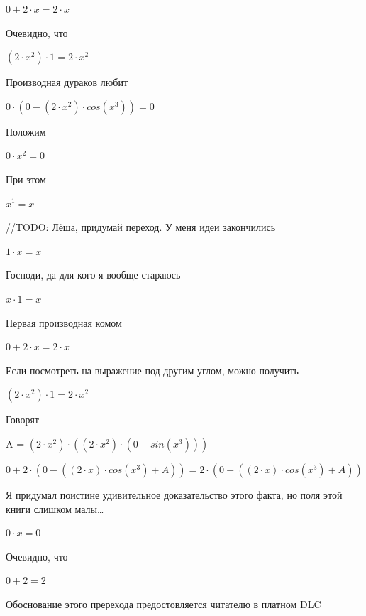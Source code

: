 \documentclass[12pt,a4paper,fleqn]{article}
\begin{document}
\begin{center}
$0+2 \cdot x = 2 \cdot x$\end{center}
Очевидно, что

\begin{center}
$(2 \cdot x^{2}) \cdot 1 = 2 \cdot x^{2}$\end{center}
Производная дураков любит\cite{link2}

\begin{center}
$0 \cdot (0-(2 \cdot x^{2}) \cdot cos(x^{3})) = 0$\end{center}
Положим

\begin{center}
$0 \cdot x^{2} = 0$\end{center}
При этом

\begin{center}
$x^{1} = x$\end{center}
//TODO: Лёша, придумай переход. У меня идеи закончились

\begin{center}
$1 \cdot x = x$\end{center}
Господи, да для кого я вообще стараюсь

\begin{center}
$x \cdot 1 = x$\end{center}
Первая производная комом\cite{link2}

\begin{center}
$0+2 \cdot x = 2 \cdot x$\end{center}
Если посмотреть на выражение под другим углом, можно получить

\begin{center}
$(2 \cdot x^{2}) \cdot 1 = 2 \cdot x^{2}$\end{center}
Говорят

\begin{center}
A = $(2 \cdot x^{2}) \cdot ((2 \cdot x^{2}) \cdot (0-sin(x^{3})))$\end{center}
\begin{center}
$0+2 \cdot (0-((2 \cdot x) \cdot cos(x^{3})+A)) = 2 \cdot (0-((2 \cdot x) \cdot cos(x^{3})+A))$\end{center}
Я придумал поистине удивительное доказательство этого факта, но поля этой книги слишком малы\ldots

\begin{center}
$0 \cdot x = 0$\end{center}
Очевидно, что

\begin{center}
$0+2 = 2$\end{center}
Обоснование этого пререхода предостовляется читателю в платном DLC
\end{document}

